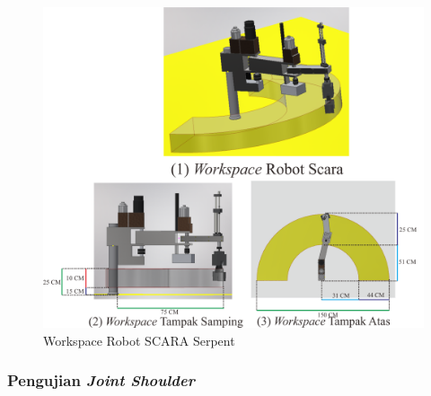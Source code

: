 \begin{figure}[H]
	\centering
	\includegraphics[width=13cm]{gambar/WORKSPACE.png}
	\caption{Workspace Robot SCARA Serpent}
	\label{pic.workpace}
\end{figure}


\subsubsection{Pengujian \textit{Joint Shoulder}}

